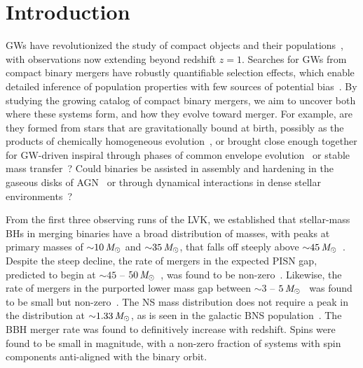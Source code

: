 \section{Introduction}\label{sec:intro}
\acresetall
{}

\Acp{GW} have revolutionized the study of compact objects and their populations~\citep{LIGOScientific:2016dsl,LIGOScientific:2018jsj,LIGOScientific:2020kqk,KAGRA:2021duu}, with observations now extending beyond redshift $z=1$. Searches for \acp{GW} from compact binary mergers have robustly quantifiable selection effects, which enable detailed inference of population properties with few sources of potential bias~\citep{Mandel:2018mve, Vitale:2020aaz, Essick:2023upv}.  By studying the growing catalog of compact binary mergers, we aim to uncover both where these systems form, and how they evolve toward merger.  For example, are they formed from stars that are gravitationally bound at birth, possibly as the products of chemically homogeneous evolution~\citep{Mandel:2015qlu,Marchant:2016wow,deMink:2016vkw}, or brought close enough together for \ac{GW}-driven inspiral through phases of common envelope evolution~\citep{Bethe:1998bn,PortegiesZwart:1997ugk,Belczynski:2001uc,Dominik:2014yma} or stable mass transfer~\citep{Hurley:2002rf,Neijssel:2019irh,vanSon:2021zpk}?  Could binaries be assisted in assembly and hardening in the gaseous disks of \ac{AGN}~\citep{McKernan:2012rf,Bartos:2016dgn,Stone:2016wzz,Fragione:2018yrb} or through dynamical interactions in dense stellar environments~\citep{Kulkarni:1993fr,Sigurdsson:1993zrm,PortegiesZwart:1999nm,Ziosi:2014sra}?

From the first three observing runs of the \ac{LVK}, we established that stellar-mass \acp{BH} in merging binaries have a broad distribution of masses, with peaks at primary masses of ${\sim}10\,\mathit{M_\odot}$ and ${\sim}35\,\mathit{M_\odot}$, that falls off steeply above ${\sim}45\,\mathit{M_\odot}$~\citep{KAGRA:2021duu}.  Despite the steep decline, the rate of mergers in the expected \ac{PISN} gap, predicted to begin at ${\sim}45$ -- $50\,\mathit{M_\odot}$~\citep{Woosley:2016hmi,Farmer:2019jed}, was found to be non-zero~\citep{LIGOScientific:2020iuh,LIGOScientific:2020ufj}.  Likewise, the rate of mergers in the purported lower mass gap between ${\sim}3$ -- $5\,\mathit{M_\odot}$~\citep{Bailyn:1997xt,Ozel:2010su,Farr:2010tu} was found to be small but non-zero~\citep{LIGOScientific:2020zkf,LIGOScientific:2024elc}.  The \ac{NS} mass distribution does not require a peak in the distribution at ${\sim}1.33\,\mathit{M_\odot}$, as is seen in the galactic \ac{BNS} population~\citep{Ozel:2016oaf,Farrow:2019xnc}. The \ac{BBH} merger rate was found to definitively increase with redshift.  Spins were found to be small in magnitude, with a non-zero fraction of systems with spin components anti-aligned with the binary orbit.

